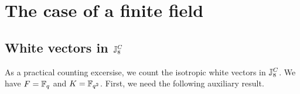 %		
%					
%
%
% 

\section{The case of a finite field}
\subsection{White vectors in $\mathbb{J}_8^C$}

As a practical counting excersise, we count the isotropic white vectors in $\mathbb{J}_{8}^{C}$.
We have $F = \mathbb{F}_q$ and $K = \mathbb{F}_{q^2}$. First, we need the following auxiliary result.

